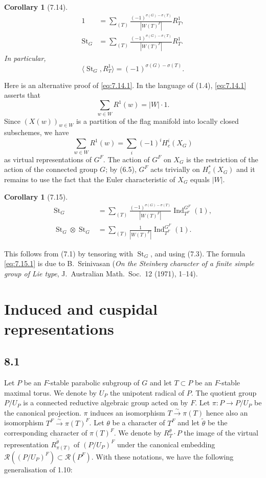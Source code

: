\documentclass[11pt]{amsart}
\theoremstyle{plain}
\newtheorem{corollary}[theorem]{Corollary}
\theoremstyle{remark}
\DeclareMathOperator{\Ind}{Ind}
\DeclareMathOperator{\St}{St}
\begin{document}
\begin{corollary}[7.14]
\begin{align}
\label{eq:7.14.1} 1 &= \sum_{(T)} \frac{(-1)^{\sigma(G) - \sigma(T)}}{|W(T)^F|} R_T^1, \\
\label{eq:7.14.2} \St_G &= \sum_{(T)} \frac{(-1)^{\sigma(G) - \sigma(T)}}{|W(T)^F|} R_T^1.
\end{align}
In particular,
\[
\langle \St_G, R_T^1 \rangle = (-1)^{\sigma(G) - \sigma(T)}.
\]
\end{corollary}

Here is an alternative proof of \eqref{eq:7.14.1}. In the language of (1.4), \eqref{eq:7.14.1} asserts that
\[
\sum_{w \in W} R^1(w) = |W| \cdot 1.
\]
Since $(X(w))_{w \in W}$ is a partition of the flag manifold into locally closed subschemes, we have
\[
\sum_{w \in W} R^1(w) = \sum_i (-1)^i H_c^i(X_G)
\]
as virtual representations of $G^F$. The action of $G^F$ on $X_G$ is the restriction of the action of the connected group $G$; by (6.5), $G^F$ acts trivially on $H_c^*(X_G)$ and it remains to use the fact that the Euler characteristic of $X_G$ equals $|W|$.

\begin{corollary}[7.15]
\begin{align}
\label{eq:7.15.1} \St_G &= \sum_{(T)} \frac{(-1)^{\sigma(G) - \sigma(T)}}{|W(T)^F|} \Ind_{T^F}^{G^F}(1), \\
\label{eq:7.15.2} \St_G \otimes \St_G &= \sum_{(T)} \frac{1}{|W(T)^F|} \Ind_{T^F}^{G^F}(1).
\end{align}
\end{corollary}

This follows from (7.1) by tensoring with $\St_G$, and using (7.3). The formula \eqref{eq:7.15.1} is due to B.\ Srinivasan (\textit{On the Steinberg character of a finite simple group of Lie type}, J.\ Australian Math.\ Soc.\ 12 (1971), 1--14).

\section{Induced and cuspidal representations}

\subsection{8.1} Let $P$ be an $F$-stable parabolic subgroup of $G$ and let $T \subset P$ be an $F$-stable maximal torus. We denote by $U_P$ the unipotent radical of $P$. The quotient group $P/U_P$ is a connected reductive algebraic group acted on by $F$. Let $\pi: P \to P/U_P$ be the canonical projection. $\pi$ induces an isomorphism $T \xrightarrow{\sim} \pi(T)$ hence also an isomorphism $T^F \xrightarrow{\sim} \pi(T)^F$. Let $\theta$ be a character of $T^F$ and let $\tilde{\theta}$ be the corresponding character of $\pi(T)^F$. We denote by $R_T^\theta \cdot P$ the image of the virtual representation $R_{\pi(T)}^{\tilde{\theta}}$ of $(P/U_P)^F$ under the canonical embedding $\mathcal{R}((P/U_P)^F) \subset \mathcal{R}(P^F)$. With these notations, we have the following generalisation of 1.10:
\end{document}
